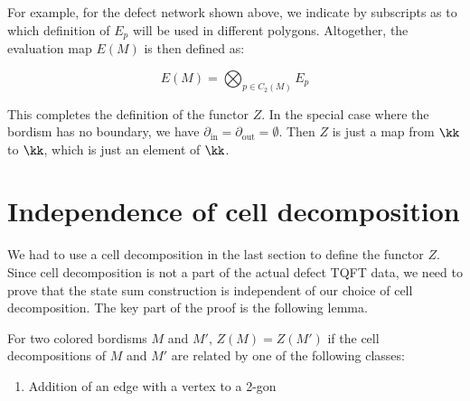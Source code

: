 \begin{defectfiguresetup}
For example, for the defect network shown above, we indicate by subscripts as to which definition of $E_p$ will be used in different polygons. Altogether, the evaluation map $E(M)$ is then defined as:

\begin{equation}
	E(M) = \bigotimes_{p \in C_2(M)} E_p
\end{equation}

This completes the definition of the functor $Z$. In the special case where the bordism has no boundary, we have $\partial_{\mathrm{in}} = \partial_{\mathrm{out}} = \emptyset$. Then $Z$ is just a map from $\kk$ to $\kk$, which is just an element of $\kk$.

\section{Independence of cell decomposition}\label{s:decomposition-independence}
We had to use a cell decomposition in the last section to define the functor $Z$. Since cell decomposition is not a part of the actual defect TQFT data, we need to prove that the state sum construction is independent of our choice of cell decomposition. The key part of the proof is the following lemma.

\begin{lemma}\label{l:invariance-under-local-moves}
	For two colored bordisms $M$ and $M'$, $Z(M) = Z(M')$ if the cell decompositions of $M$ and $M'$ are related by one of the following classes:
	\begin{enumerate}
		\item Addition of an edge with a vertex to a 2-gon
		
		\newcommand{\twogonA}{%
			\vcenter{\hbox{%
					\begin{tikzpicture}[scale=0.20]
						\begin{pgfonlayer}{nodelayer}
							\node [0cell] (left) at (-4, 0) {};
							\node [0cell] (right) at (5, 0) {};
							\node [style=none] (bottom) at (0.25, -2.85) {};
							\node [style=none] (top) at (0.5, 2.85) {};
						\end{pgfonlayer}
						\begin{pgfonlayer}{edgelayer}
							\draw [1cell, bend left=60, looseness=1.25] (left.center) to (right.center);
							\draw [1cell, bend right=60, looseness=1.25] (left.center) to (right.center);
							\draw [midarrow=0.75, defect, bend right=15] (bottom.center) to (top.center);
						\end{pgfonlayer}
					\end{tikzpicture}%
			}}%
		}
		

\end{enumerate}
\end{lemma}
\end{defectfiguresetup}
